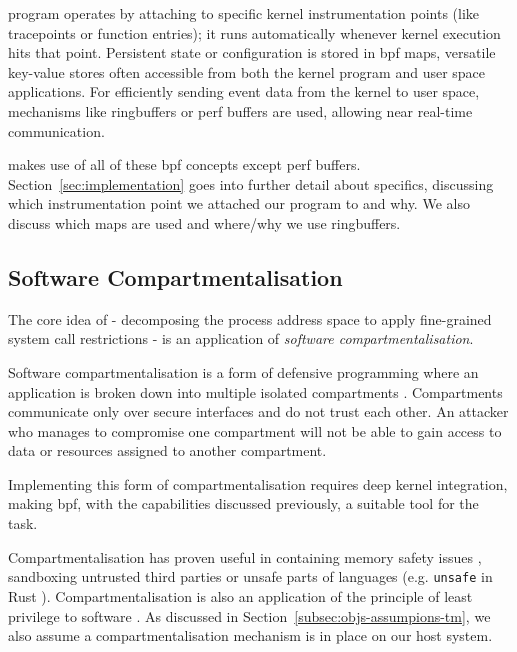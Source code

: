  program operates by attaching to specific kernel instrumentation
points (like tracepoints or function entries); it runs automatically
whenever kernel execution hits that point. Persistent state or configuration
is stored in \ac{bpf} maps, versatile key-value stores often accessible from both
the kernel program and user space applications. For efficiently sending
event data from the kernel to user space, mechanisms like ringbuffers or
perf buffers are used, allowing near real-time communication.

\af makes use of all of these \ac{bpf} concepts except perf buffers.
Section~\ref{sec:implementation} goes into further detail about specifics,
discussing which instrumentation point we attached our program to and why. We
also discuss which maps are used and where/why we use ringbuffers.

\subsection{Software Compartmentalisation}

The core idea of \af{}- decomposing the process address space to apply 
fine-grained system call restrictions - is an application of \textit{software
compartmentalisation}.

Software compartmentalisation is a form of defensive programming where an application
is broken down into multiple isolated compartments \cite{SOK}. Compartments
communicate only over secure interfaces and do not trust each other. An
attacker who manages to compromise one compartment will not be able to gain
access to data or resources assigned to another compartment.  

Implementing this form of compartmentalisation requires deep kernel
integration, making \ac{bpf}, with the capabilities discussed previously, a 
suitable tool for the task.  

Compartmentalisation has proven useful in containing memory safety issues
\cite{CONFFUZZ}, sandboxing untrusted third parties \cite{ANDROID_SOK} or
unsafe parts of languages \cite{MPK} (e.g. \texttt{unsafe} in Rust 
\cite{rustbook_unsafe}). Compartmentalisation is also an application of the
principle of least privilege to software \cite{PRIVMAN}. As discussed in 
Section~\ref{subsec:objs-assumpions-tm}, we also assume a compartmentalisation
mechanism is in place on our host system.
